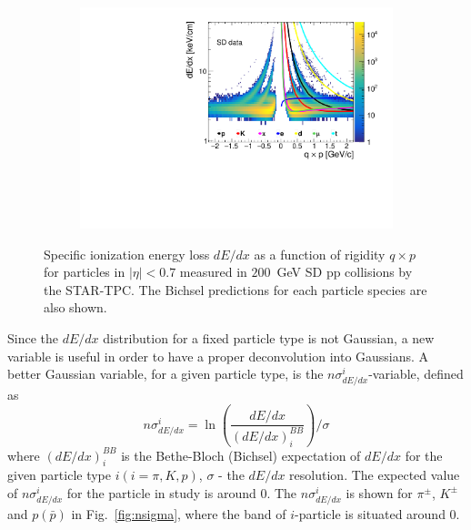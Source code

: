 \begin{figure}[H]
	\centering
	\parbox{0.99\textwidth}{
		\centering
		\begin{subfigure}[b]{\linewidth}{
				{\includegraphics[width=\linewidth, page=1]{graphics/pid/SDT_dEdx.pdf}}}
		\end{subfigure}
	}
	\caption[Specific ionization
		energy loss $dE/dx$ as a function of rigidity $q\times p$ for particles
		in $|\eta| < 0.7$ measured in $200$~GeV SD pp collisions
		by the STAR-TPC]{Specific ionization
	energy loss $dE/dx$ as a function of rigidity $q\times p$ for particles
	in $|\eta| < 0.7$ measured in $200$~GeV SD pp collisions
	by the STAR-TPC. The Bichsel predictions for each particle species are also shown.}
	\label{fig:dedx}
\end{figure} 
\noindent Since the $dE/dx$ distribution for a fixed particle type
is not Gaussian, a new variable is useful in order
to have a proper deconvolution into Gaussians. A better Gaussian variable, for a given
particle type, is the $n\sigma^i_{dE/dx}$-variable, defined as
\begin{equation}
n\sigma^i_{dE/dx}=\ln\left(\frac{dE/dx}{(dE/dx)_i^{BB}}\right)/\sigma
\end{equation}
where $(dE/dx)_i^{BB}$ is the Bethe-Bloch (Bichsel) expectation
of $dE/dx$ for the given particle type $i (i =
\pi, K, p)$, $\sigma$ - the $dE/dx$ resolution.
The expected value of $n\sigma^i_{dE/dx}$ for the particle in study is around $0$. The $n\sigma^i_{dE/dx}$ is shown for $\pi^{\pm}$, $K^\pm$ and $p(\bar{p})$ in Fig.~\ref{fig:nsigma}, where the band of $i$-particle is situated around 0.



